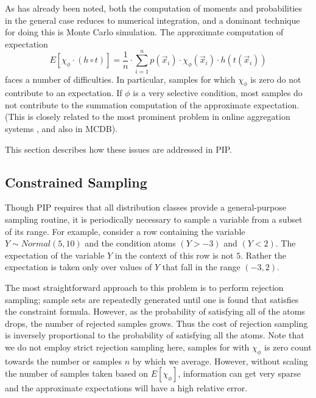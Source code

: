 

As has already been noted, both the computation of moments and probabilities in the general case reduces to numerical integration, and a dominant technique for doing this is Monte Carlo simulation. The approximate computation of expectation
\begin{equation}
E[\chi_\phi \cdot (h \circ t)] =
\frac{1}{n} \cdot \sum_{i=1}^n p(\vec{x}_i) \cdot \chi_\phi(\vec{x}_i) \cdot
h(t(\vec{x}_i))
\end{equation}
faces a number of difficulties.  In particular, samples for which $\chi_{\phi}$ is zero do not contribute to an expectation.  If $\phi$ is a very selective condition, most samples do not contribute to the summation computation of the approximate expectation.  (This is closely related to the most prominent problem in online aggregation systems \cite{OnlineAggregation,DBO}, and also in MCDB).

This section describes how these issues are addressed in PIP.


\subsection{Constrained Sampling}
\label{subsec:csampling}


Though  PIP   requires  that   all  distribution  classes   provide  a
general-purpose  sampling  routine, it  is  periodically necessary  to
sample a variable from a subset of its range.  For example, consider a
row  containing  the variable  $Y \sim Normal(5,10)$  and the  condition
atoms $(Y >  -3)$ and $(Y < 2)$.  The expectation  of the variable $Y$
in the  context of  this row  is not $5$.   Rather the  expectation is
taken only over values of $Y$ that fall in the range $(-3,2)$.

The  most  straightforward approach  to  this  problem  is to  perform
rejection sampling; sample sets  are repeatedly generated until one is
found  that  satisfies  the   constraint  formula.   However,  as  the
probability  of satisfying  all  of  the atoms  drops,  the number  of
rejected  samples  grows.  Thus  the  cost  of  rejection sampling  is
inversely proportional to the probability of satisfying all the atoms.
Note that we do not employ strict rejection sampling here, samples for with $\chi_{\phi}$ is zero count towards the number or samples $n$ by which we average.  However, without scaling the number of samples taken based on $E[\chi_\phi]$, information can get very sparse and the approximate expectations will have a high relative error. 

